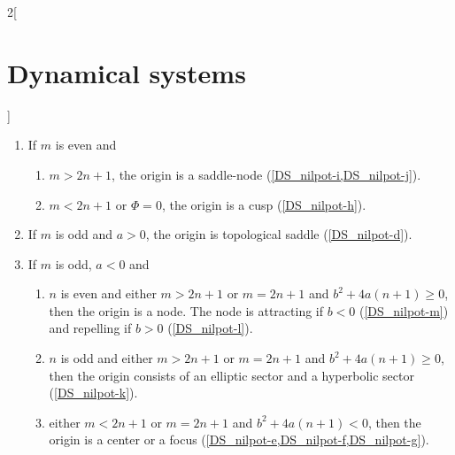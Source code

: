 \documentclass[../../../main_math.tex]{subfiles}
\begin{document}
\begin{multicols}{2}[\section{Dynamical systems}]
\begin{theorem}
\begin{enumerate}
            \begin{enumerate}
              \item If $m$ is even and
                    \begin{enumerate}
                      \item $m >2n + 1$, the origin is a saddle-node (\cref{DS_nilpot-i,DS_nilpot-j}).
                      \item $m <2n + 1$ or $\Phi=0$, the origin is a cusp (\cref{DS_nilpot-h}).
                    \end{enumerate}
              \item If $m$ is odd and $a >0$, the origin is topological saddle (\cref{DS_nilpot-d}).
              \item If $m$ is odd, $a <0$ and
                    \begin{enumerate}
                      \item $n$ is even and either $m >2n + 1$ or $m =2n + 1$ and $b^2+4a(n +1)\geq 0$, then the origin is a node. The node is attracting if $b<0$ (\cref{DS_nilpot-m}) and repelling if $b>0$ (\cref{DS_nilpot-l}).
                      \item $n$ is odd and either $m >2n + 1$ or $m =2n + 1$ and $b^2+4a(n +1)\geq 0$, then the origin consists of an elliptic sector and a hyperbolic sector (\cref{DS_nilpot-k}).
                      \item either $m <2n + 1$ or $m =2n + 1$ and $b^2+4a(n +1)<0$, then the origin is a center or a focus (\cref{DS_nilpot-e,DS_nilpot-f,DS_nilpot-g}).
                    \end{enumerate}
            \end{enumerate}
    \end{enumerate}
    \begin{figure}[H]
      \centering
      \begin{subfigure}[b]{0.3\linewidth}
        \centering
        
        \caption{}
        \label{DS_nilpot-a}
      \end{subfigure}
      \hfill
      \begin{subfigure}[b]{0.3\linewidth}
        \centering
        
        \caption{}
        \label{DS_nilpot-b}
      \end{subfigure}
      \hfill
      \begin{subfigure}[b]{0.3\linewidth}
        \centering
        

\end{subfigure}
\end{figure}
\end{theorem}
\end{multicols}
\end{document}
